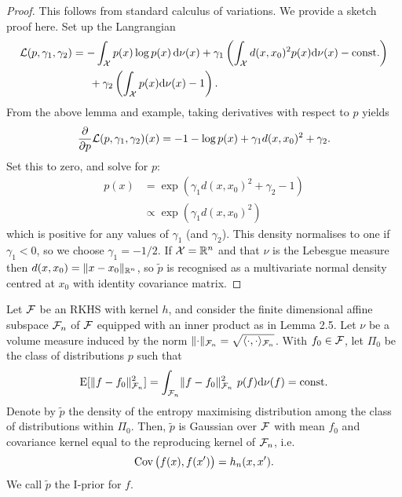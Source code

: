 \begin{proof}
  This follows from standard calculus of variations.
  We provide a sketch proof here.
  Set up the Langrangian
  \begin{align*}
      {\mathcal L}(p,\gamma_1,\gamma_2) &= 
      - \int_{\mathcal X} p(x) \log p(x) \, \text{d}\nu(x) +
      \gamma_1 \left(\int_{\mathcal X} d(x,x_0)^2 p(x) \text{d}\nu(x) - \text{const.} \right) \\
      &\phantom{==} + \gamma_2 \left( \int_{\mathcal X} p(x) \text{d}\nu(x) - 1 \right).
  \end{align*}
  From the above lemma and example, taking derivatives with respect to $p$ yields
  \begin{align*}
    \frac{\partial}{\partial p} {\mathcal L}(p,\gamma_1,\gamma_2)(x)
    = - 1 - \log p(x) + \gamma_1 d(x,x_0)^2 + \gamma_2.
  \end{align*}
  Set this to zero, and solve for $p$:
  \begin{align*}
    p(x) &= \exp \left( \gamma_1 d(x,x_0)^2 + \gamma_2 - 1 \right) \\
    &\propto \exp \left( \gamma_1 d(x,x_0)^2 \right)
  \end{align*}
  which is positive for any values of $\gamma_1$ (and $\gamma_2$).
  This density normalises to one if $\gamma_1 < 0$, so we choose $\gamma_1=-1/2$.
  If ${\mathcal X} = \mathbb{R}^n$ and that $\nu$ is the Lebesgue measure then $d(x,x_0) = \lVert x-x_0\rVert_{\mathbb{R}^n}$, so $\tilde p$ is recognised as a multivariate normal density centred at $x_0$ with identity covariance matrix.
\end{proof}

\begin{theorem}
  Let ${\mathcal F}$ be an RKHS with kernel $h$, and consider the finite dimensional affine subspace ${\mathcal F}_n$ of ${\mathcal F}$ equipped with an inner product as in Lemma 2.5.
  Let $\nu$ be a volume measure induced by the norm $\lVert\cdot\rVert_{{\mathcal F}_n} = \sqrt{\langle\cdot,\cdot\rangle_{{\mathcal F}_n}}$.
  With $f_0 \in {\mathcal F}$, let $\Pi_0$ be the class of distributions $p$ such that 
  \[
    \operatorname{E}[\lVert f-f_0\rVert^2_{{\mathcal F}_n}] = \int_{{\mathcal F}_n} \lVert f-f_0\rVert^2_{{\mathcal F}_n} \ p(f) \text{d}\nu(f) = \text{const.}
  \]
  Denote by $\tilde p$ the density of the entropy maximising distribution among the class of distributions within $\Pi_0$.
  Then, $\tilde p$ is Gaussian over ${\mathcal F}$ with mean $f_0$ and covariance kernel equal to the reproducing kernel of ${\mathcal F}_n$, i.e.
  \[
    \operatorname{Cov}\big(f(x),f(x')\big) = h_n(x,x').
  \]
  We call $\tilde p$ the I-prior for $f$.
\end{theorem}

